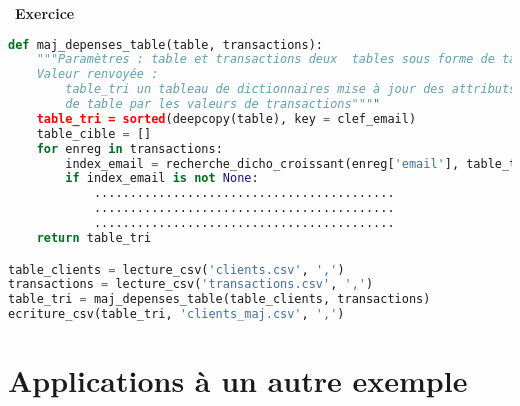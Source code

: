 \documentclass[
  11pt,
]{article}
\newcounter{exo}
\newenvironment{exercice}[1]
{\par \medskip   \addtocounter{exo}{1} \noindent  
\begin{bclogo}[arrondi =0.1,   noborder = true, logo=\bccrayon, marge=4]{~\textbf{Exercice} \textbf{\theexo} {\itshape #1} }  \par}
{
\end{bclogo}
 \par \bigskip }
\newcounter{def}
\begin{document}
\begin{exercice}{}
\begin{enumerate}
\begin{lstlisting}[language=Python]
def maj_depenses_table(table, transactions): 
    """Paramètres : table et transactions deux  tables sous forme de tableaux de dictionnaires
    Valeur renvoyée :
        table_tri un tableau de dictionnaires mise à jour des attributs 'visites' et 'dépenses'
        de table par les valeurs de transactions""""       
    table_tri = sorted(deepcopy(table), key = clef_email)
    table_cible = []
    for enreg in transactions:
        index_email = recherche_dicho_croissant(enreg['email'], table_tri, 'email')
        if index_email is not None:
            ..........................................
            ..........................................
            ..........................................
    return table_tri

table_clients = lecture_csv('clients.csv', ',')
transactions = lecture_csv('transactions.csv', ',') 
table_tri = maj_depenses_table(table_clients, transactions)
ecriture_csv(table_tri, 'clients_maj.csv', ',')
\end{lstlisting}
\end{enumerate}

\end{exercice}

\hypertarget{applications-uxe0-un-autre-exemple}{%
\section{Applications à un autre
exemple}\label{applications-uxe0-un-autre-exemple}}
\end{document}

